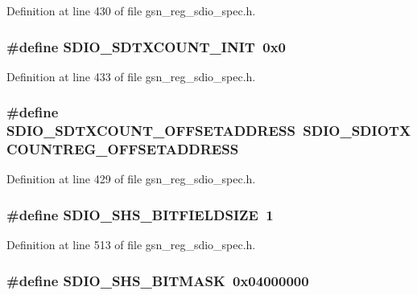 Definition at line 430 of file gsn\_\-reg\_\-sdio\_\-spec.h.

\hypertarget{a00571_a8f86df6d02f326f35427f22a4cf3ed38}{
\subsubsection[{SDIO\_\-SDTXCOUNT\_\-INIT}]{\setlength{\rightskip}{0pt plus 5cm}\#define SDIO\_\-SDTXCOUNT\_\-INIT~0x0}}
\label{a00571_a8f86df6d02f326f35427f22a4cf3ed38}


Definition at line 433 of file gsn\_\-reg\_\-sdio\_\-spec.h.

\hypertarget{a00571_a9391f2bdd521d696fdb6e51c879c25c0}{
\subsubsection[{SDIO\_\-SDTXCOUNT\_\-OFFSETADDRESS}]{\setlength{\rightskip}{0pt plus 5cm}\#define SDIO\_\-SDTXCOUNT\_\-OFFSETADDRESS~SDIO\_\-SDIOTXCOUNTREG\_\-OFFSETADDRESS}}
\label{a00571_a9391f2bdd521d696fdb6e51c879c25c0}


Definition at line 429 of file gsn\_\-reg\_\-sdio\_\-spec.h.

\hypertarget{a00571_ad23e926ab988cff1f125e6c8c9aa401d}{
\subsubsection[{SDIO\_\-SHS\_\-BITFIELDSIZE}]{\setlength{\rightskip}{0pt plus 5cm}\#define SDIO\_\-SHS\_\-BITFIELDSIZE~1}}
\label{a00571_ad23e926ab988cff1f125e6c8c9aa401d}


Definition at line 513 of file gsn\_\-reg\_\-sdio\_\-spec.h.

\hypertarget{a00571_ae0027247fd2b70822f83a1d4750b19a5}{
\subsubsection[{SDIO\_\-SHS\_\-BITMASK}]{\setlength{\rightskip}{0pt plus 5cm}\#define SDIO\_\-SHS\_\-BITMASK~0x04000000}}
\label{a00571_ae0027247fd2b70822f83a1d4750b19a5}


